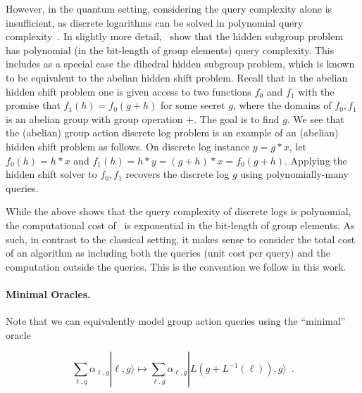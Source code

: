 \documentclass{article}\usepackage[a4paper,margin=20mm]{geometry}
\numberwithin{theorem}{section}
\numberwithin{equation}{section}
\begin{document}
However, in the quantum setting, considering the query complexity alone is insufficient, as discrete logarithms can be solved in polynomial query complexity~\cite{EttHoy00}. In slightly more detail,~\cite{EttHoy00} show that the hidden subgroup problem has polynomial (in the bit-length of group elements) query complexity. This includes as a special case the dihedral hidden subgroup problem, which is known to be equivalent to the abelian hidden shift problem. Recall that in the abelian hidden shift problem one is given access to two functions $f_0$ and $f_1$ with the promise that $f_1(h)=f_0(g+h)$ for some secret $g$, where the domains of $f_0,f_1$ is an abelian group with group operation $+$. The goal is to find $g$. We see that the (abelian) group action discrete log problem is an example of an (abelian) hidden shift problem as follows. On discrete log instance $y=g*x$, let $f_0(h)=h*x$ and $f_1(h)=h*y=(g+h)*x=f_0(g+h)$. Applying the hidden shift solver to $f_0,f_1$ recovers the discrete log $g$ using polynomially-many queries.

While the above shows that the query complexity of discrete logs is polynomial, the computational cost of~\cite{EttHoy00} is exponential in the bit-length of group elements. As such, in contrast to the classical setting, it makes sense to consider the total cost of an algorithm as including both the queries (unit cost per query) and the computation outside the queries. This is the convention we follow in this work.


\paragraph{Minimal Oracles.} Note that we can equivalently model group action queries using the ``minimal'' oracle

\[\sum_{\ell,g}\alpha_{\ell,g}|\ell,g\rangle\mapsto\sum_{\ell,g}\alpha_{\ell,g}|L(g+L^{-1}(\ell)),g\rangle\enspace .\]
\end{document}

